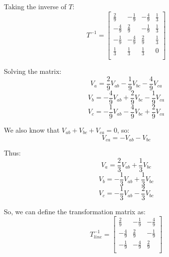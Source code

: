Taking the inverse of \( T \):
\[
    T^{-1} = \begin{bmatrix}
        \frac{2}{9}  & -\frac{1}{9} & -\frac{4}{9} & \frac{1}{3} \\
        -\frac{4}{9} & \frac{2}{9}  & -\frac{1}{9} & \frac{1}{3} \\
        -\frac{1}{9} & -\frac{4}{9} & \frac{2}{9}  & \frac{1}{3} \\
        \frac{1}{3}  & \frac{1}{3}  & \frac{1}{3}  & 0           \\
    \end{bmatrix}
\]

Solving the matrix:
\[
    V_a = \frac{2}{9}V_{ab} - \frac{1}{9}V_{bc} - \frac{4}{9}V_{ca}
\]
\[
    V_b = -\frac{4}{9}V_{ab} + \frac{2}{9}V_{bc} - \frac{1}{9}V_{ca}
\]
\[
    V_c = -\frac{1}{9}V_{ab} - \frac{4}{9}V_{bc} + \frac{2}{9}V_{ca}
\]

We also know that \( V_{ab} + V_{bc} + V_{ca} = 0 \), so:
\[
    V_{ca} = -V_{ab} - V_{bc}
\]

Thus:
\[
    V_a = \frac{2}{3}V_{ab} + \frac{1}{3}V_{bc}
\]
\[
    V_b = -\frac{1}{3}V_{ab} + \frac{1}{3}V_{bc}
\]
\[
    V_c = -\frac{1}{3}V_{ab} - \frac{2}{3}V_{bc}
\]

So, we can define the transformation matrix as:
\[
    T_{line}^{-1} = \begin{bmatrix}
        \frac{2}{9}  & -\frac{1}{9} & -\frac{4}{9} \\
        -\frac{4}{9} & \frac{2}{9}  & -\frac{1}{9} \\
        -\frac{1}{9} & -\frac{4}{9} & \frac{2}{9}  \\
    \end{bmatrix}
\]

